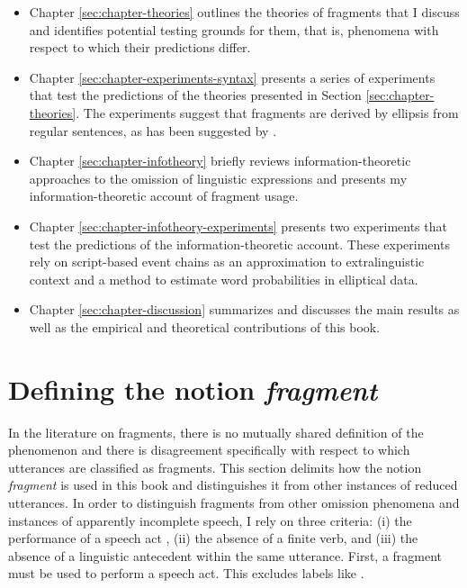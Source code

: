 \begin{itemize}\itemsep0em
 \item Chapter \ref{sec:chapter-theories} outlines the theories of fragments that I discuss and identifies potential testing grounds for them, that is, phenomena with respect to which their predictions differ.
 \item Chapter \ref{sec:chapter-experiments-syntax} presents a series of experiments that test the predictions of the theories presented in Section \ref{sec:chapter-theories}. The experiments suggest that fragments are derived by ellipsis from regular sentences, as has been suggested by \citet{reich2007}.
 \item Chapter \ref{sec:chapter-infotheory} briefly reviews information-theoretic approaches to the omission of linguistic expressions and presents my information-theoretic account of fragment usage.
 \item Chapter \ref{sec:chapter-infotheory-experiments} presents two experiments that test the predictions of the infor\-ma\-tion-theoretic account. These experiments rely on script-based event chains as an approximation to extralinguistic context and a method to estimate word probabilities in elliptical data.
 \item Chapter \ref{sec:chapter-discussion} summarizes and discusses the main results as well as the empirical and theoretical contributions of this book.
\end{itemize}

\largerpage[-2]
\section{Defining the notion \textit{fragment}}

\label{sec:intro-fragments}
In the literature on fragments, there is no mutually shared definition of the phenomenon and there is disagreement specifically with respect to which utterances are classified as fragments. This section delimits how the notion \textit{fragment} is used in this book and distinguishes it from other instances of reduced utterances. In order to distinguish fragments from other omission phenomena and instances of apparently incomplete speech, I rely on three criteria: (i) the performance of a speech act \citep{morgan1973}, (ii) the absence of a finite verb, and (iii) the absence of a linguistic antecedent within the same utterance. First, a fragment must be used to perform a speech act. This excludes labels \citep{klein1993} like \Next.

